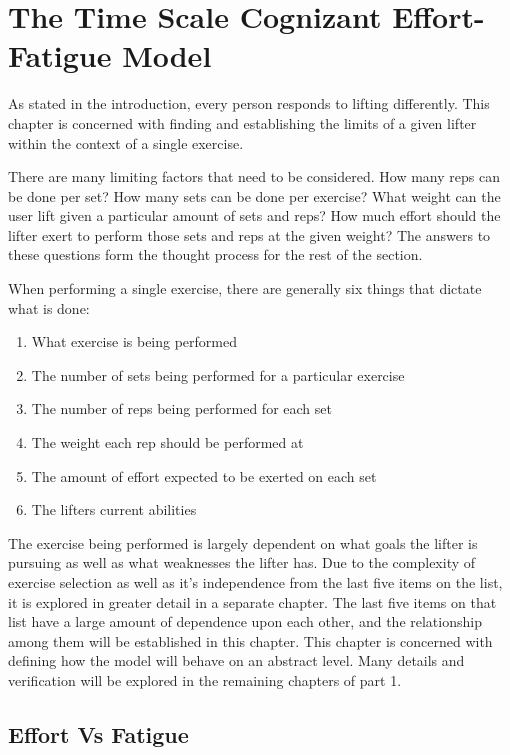 \chapter{The Time Scale Cognizant Effort-Fatigue Model}
\label{ch:TheEffortFatigueModel}

As stated in the introduction, every person responds to lifting differently. This chapter is concerned with finding and establishing the limits of a given lifter within the context of a single exercise.

There are many limiting factors that need to be considered. How many reps can be done per set? How many sets can be done per exercise? What weight can the user lift given a particular amount of sets and reps? How much effort should the lifter exert to perform those sets and reps at the given weight? The answers to these questions form the thought process for the rest of the section.

When performing a single exercise, there are generally six things that dictate what is done:
\begin{enumerate}
    \item What exercise is being performed
    \item The number of sets being performed for a particular exercise
    \item The number of reps being performed for each set
    \item The weight each rep should be performed at
    \item The amount of effort expected to be exerted on each set
    \item The lifters current abilities
\end{enumerate}

The exercise being performed is largely dependent on what goals the lifter is pursuing as well as what weaknesses the lifter has. Due to the complexity of exercise selection as well as it's independence from the last five items on the list, it is explored in greater detail in a separate chapter. The last five items on that list have a large amount of dependence upon each other, and the relationship among them will be established in this chapter. This chapter is concerned with defining how the model will behave on an abstract level. Many details and verification will be explored in the remaining chapters of part 1.

\section{Effort Vs Fatigue}
\label{sec:P2C1_EffortVsFatigue}

